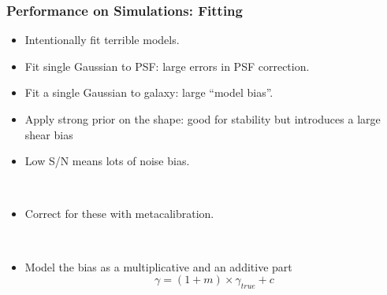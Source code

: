 \documentclass{beamer}
\newcommand{\mcal}{metacalibration}
\begin{document}
\frame
{
    \frametitle{Performance on Simulations: Fitting}

 
    \begin{itemize}
        \item Intentionally fit {\color{brightred} terrible models}.

        \item Fit single Gaussian to PSF: large errors in
            PSF correction.

        \item Fit a single Gaussian to galaxy: large ``model bias''.

        \item Apply strong prior on the shape: good for stability but
            introduces a large shear bias

        \item Low S/N means lots of noise bias.

        ~
        \item Correct for these with \mcal.

        ~
        \item Model the bias as a multiplicative and an additive part
            {\color{lightskyblue} 
                \begin{equation}
                    \gamma = (1 + m ) \times \gamma_{true} + c \nonumber
                \end{equation}
            }

    \end{itemize}
}
\end{document}
